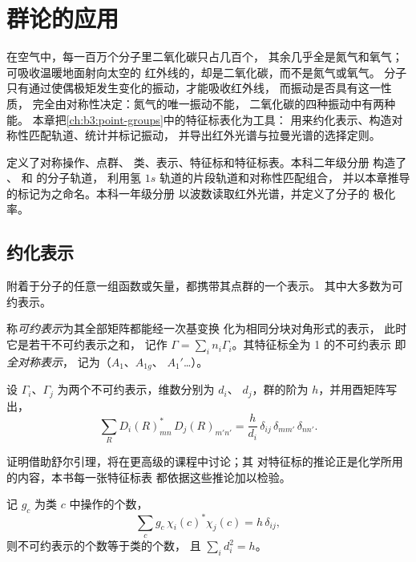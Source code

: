\chapter{群论的应用}\label{ch:b3:group-theory-applied}

在空气中，每一百万个分子里二氧化碳只占几百个，
其余几乎全是氮气和氧气；可吸收温暖地面射向太空的
红外线的，却是二氧化碳，而不是氮气或氧气。
分子只有通过使偶极矩发生变化的振动，才能吸收红外线，
而振动是否具有这一性质，
完全由对称性决定：氮气的唯一振动不能，
二氧化碳的四种振动中有两种能。
本章把\cref{ch:b3:point-groups}中的特征标表化为工具：
用来约化表示、构造对称性匹配轨道、统计并标记振动，
并导出红外光谱与拉曼光谱的选择定则。

\begin{recall}
定义了对称操作、点群、
类、表示、特征标和特征标表。本科二年级分册
构造了 、 和  的分子轨道，
利用氢 $1s$ 轨道的片段轨道和对称性匹配组合，
并以本章推导的标记为之命名。本科一年级分册
以波数读取红外光谱，并定义了分子的
极化率。
\end{recall}

\section{约化表示}

附着于分子的任意一组函数或矢量，都携带其点群的一个表示。
其中大多数为可约表示。

\begin{definition}\label{def:b3:group-theory-applied:reducible}
称\emph{可约表示}为其全部矩阵都能经一次基变换
化为相同分块对角形式的表示，
此时它是若干不可约表示之和，
记作 $\Gamma = \sum_in_i\Gamma_i$。其特征标全为 1 的不可约表示
即\emph{全对称表示}，
记为（$A_1$、$A_{1g}$、
$A_1'$\dots）。
\end{definition}

\begin{theorem}[大正交定理]\label{thm:b3:group-theory-applied:great-orthogonality}
设 $\Gamma_i$、$\Gamma_j$ 为两个不可约表示，维数分别为 $d_i$、
$d_j$，群的阶为 $h$，并用酉矩阵写出，
\[
\sum_R D_i(R)_{mn}^*\,D_j(R)_{m'n'} = \frac{h}{d_i}\,\delta_{ij}\,\delta_{mm'}\,\delta_{nn'}.
\]
\end{theorem}
\admitted

证明借助舒尔引理，将在更高级的课程中讨论；其
对特征标的推论正是化学所用的内容，本书每一张特征标表
都依据这些推论加以检验。

\begin{corollary}[特征标的正交性]\label{cor:b3:group-theory-applied:characters}
记 $g_c$ 为类 $c$ 中操作的个数，
\[
\sum_cg_c\,\chi_i(c)^*\chi_j(c) = h\,\delta_{ij},
\]
则不可约表示的个数等于类的个数，
且 $\sum_id_i^2 = h$。
\end{corollary}

